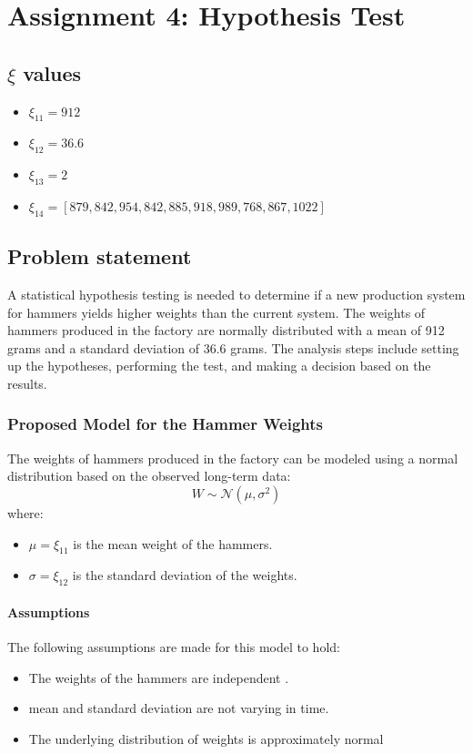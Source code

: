 \chapter{Assignment 4: Hypothesis Test}

\section*{$\xi$ values}

\begin{itemize}
    \item $\xi_{11} = 912$
    \item $\xi_{12} = 36.6$
    \item $\xi_{13} = 2$
    \item $\xi_{14} = [879, 842, 954, 842, 885, 918, 989, 768, 867, 1022]$
\end{itemize}


\section{Problem statement}

A statistical hypothesis testing is needed to determine if a new production system for hammers yields higher weights than the current system. The weights of hammers produced in the factory are normally distributed with a mean of 912 grams and a standard deviation of 36.6 grams.
The analysis steps include setting up the hypotheses, performing the test, and making a decision based on the results.

\subsection*{Proposed Model for the Hammer Weights}

The weights of hammers produced in the factory can be modeled using a normal distribution based on the observed long-term data:
\begin{equation}
W \sim \mathcal{N}(\mu, \sigma^2)
\end{equation}
where:
\begin{itemize}
    \item $\mu = \xi_{11}$ is the mean weight of the hammers.
    \item $\sigma = \xi_{12}$ is the standard deviation of the weights.
\end{itemize}

\subsubsection*{Assumptions}
The following assumptions are made for this model to hold:
\begin{itemize}
    \item The weights of the hammers are independent .
    \item mean and standard deviation are not varying in time.
    \item The underlying distribution of weights is approximately normal
\end{itemize}

